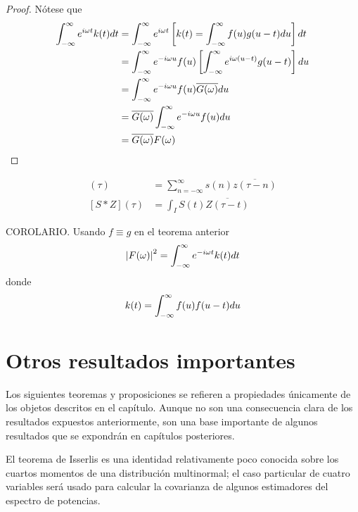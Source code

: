 \begin{proof}
Nótese que
\begin{align*}
\int_{-\infty}^{\infty} e^{i \omega t} k(t) dt &= \int_{-\infty}^{\infty} e^{i \omega t} \left[ k(t) = \int_{-\infty}^{\infty} f(u) g(u-t) du \right] dt \\
&= \int_{-\infty}^{\infty} e^{-i \omega u} f(u) \left[ \int_{-\infty}^{\infty} e^{i \omega (u-t)} g(u-t) \right] du \\
&= \int_{-\infty}^{\infty} e^{-i \omega u} f(u) \overline{G(\omega)} du \\
&= \overline{G(\omega)} \int_{-\infty}^{\infty} e^{-i \omega u} f(u)  du \\
&= \overline{G(\omega)} F(\omega) \\
\end{align*}
\end{proof}

\begin{align*}
[s \ast z] (\tau) &= \sum_{n=-\infty}^{\infty} s(n) \overline{z(\tau-n)} \\
[S \ast Z] (\tau) &= \int_I S(t) \overline{Z(\tau-t)}
\end{align*}

\begin{teorema}
COROLARIO. Usando $f \equiv g$ en el teorema anterior
\begin{equation}
\left| F(\omega) \right|^{2} = \int_{-\infty}^{\infty} e^{- i \omega t} k(t) dt 
\end{equation}
donde 
\begin{equation}
k(t) = \int_{-\infty}^{\infty} f(u) f(u-t) du
\end{equation}
\end{teorema}


\section{Otros resultados importantes}

Los siguientes teoremas y proposiciones se refieren a propiedades únicamente de los objetos descritos en el capítulo.
%
Aunque no son una consecuencia clara de los resultados expuestos anteriormente, son una base importante de algunos resultados que se expondrán en capítulos posteriores.

El teorema de Isserlis es una identidad relativamente poco conocida sobre los cuartos momentos de una distribución multinormal; el caso particular de cuatro variables será usado para calcular la covarianza de algunos estimadores del espectro de potencias.

